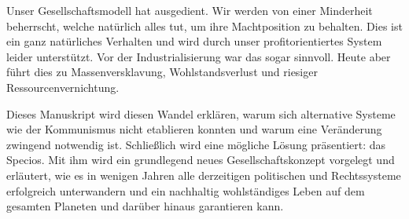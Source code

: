 Unser Gesellschaftsmodell hat ausgedient. Wir werden von einer Minderheit beherrscht, welche natürlich alles tut, um ihre Machtposition zu behalten. Dies ist ein ganz natürliches Verhalten und wird durch unser profitorientiertes System leider unterstützt. Vor der Industrialisierung war das sogar sinnvoll. Heute aber führt dies zu Massenversklavung, Wohlstandsverlust und riesiger Ressourcenvernichtung.

Dieses Manuskript wird diesen Wandel erklären, warum sich alternative Systeme wie der Kommunismus nicht etablieren konnten und warum eine Veränderung zwingend notwendig ist. Schließlich wird eine mögliche Lösung präsentiert: das Specios. Mit ihm wird ein grundlegend neues Gesellschaftskonzept vorgelegt und erläutert, wie es in wenigen Jahren alle derzeitigen politischen und Rechtssysteme erfolgreich unterwandern und ein nachhaltig wohlständiges Leben auf dem gesamten Planeten und darüber hinaus garantieren kann.
